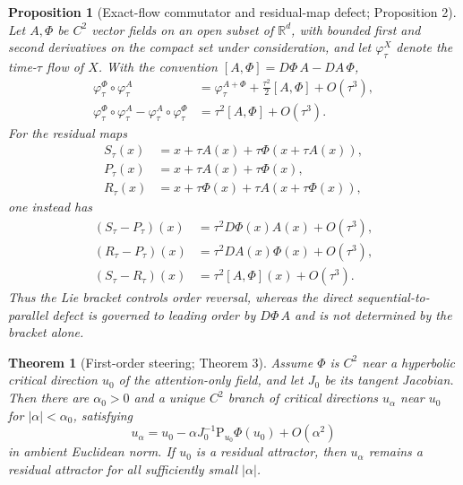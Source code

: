 \documentclass[11pt]{article}
\newtheorem{theorem}{Theorem}
\newtheorem{proposition}{Proposition}
\newcommand{\R}{\mathbb{R}}
\newcommand{\Proj}{\mathrm{P}}
\begin{document}
\begin{proposition}[Exact-flow commutator and residual-map defect; Proposition 2]
\label{supp:prop:comm}
Let $A,\Phi$ be $C^2$ vector fields on an open subset of $\R^d$, with bounded
first and second derivatives on the compact set under consideration, and let
$\varphi^X_\tau$ denote the time-$\tau$ flow of $X$. With the convention
$[A,\Phi]=D\Phi\,A-DA\,\Phi$,
\begin{align}
\varphi^\Phi_\tau\circ\varphi^A_\tau
&=\varphi^{A+\Phi}_\tau+\frac{\tau^2}{2}[A,\Phi]+O(\tau^3),
\label{supp:eq:comm}\\
\varphi^\Phi_\tau\circ\varphi^A_\tau-
\varphi^A_\tau\circ\varphi^\Phi_\tau
&=\tau^2[A,\Phi]+O(\tau^3).
\label{eq:order-defect}
\end{align}
For the residual maps
\begin{align}
S_\tau(x)&=x+\tau A(x)+\tau\Phi(x+\tau A(x)),\\
P_\tau(x)&=x+\tau A(x)+\tau\Phi(x),\\
R_\tau(x)&=x+\tau\Phi(x)+\tau A(x+\tau\Phi(x)),
\end{align}
one instead has
\begin{align}
(S_\tau-P_\tau)(x)&=\tau^2D\Phi(x)A(x)+O(\tau^3),
\label{eq:parallel-defect}\\
(R_\tau-P_\tau)(x)&=\tau^2DA(x)\Phi(x)+O(\tau^3),\\
(S_\tau-R_\tau)(x)&=\tau^2[A,\Phi](x)+O(\tau^3).
\end{align}
Thus the Lie bracket controls order reversal, whereas the direct
sequential-to-parallel defect is governed to leading order by $D\Phi\,A$ and is
not determined by the bracket alone.
\end{proposition}

\begin{theorem}[First-order steering; Theorem 3]\label{supp:thm:steer}
Assume $\Phi$ is $C^2$ near a hyperbolic critical direction $u_0$ of the
attention-only field, and let $J_0$ be its tangent Jacobian. Then there are
$\alpha_0>0$ and a unique $C^2$ branch of critical directions $u_\alpha$ near $u_0$ for
$|\alpha|<\alpha_0$, satisfying
\begin{equation}
u_\alpha=u_0-\alpha J_0^{-1}\Proj_{u_0}\Phi(u_0)+O(\alpha^2)
\label{supp:eq:steer}
\end{equation}
in ambient Euclidean norm. If $u_0$ is a residual attractor, then $u_\alpha$
remains a residual attractor for all sufficiently small $|\alpha|$.
\end{theorem}
\end{document}
